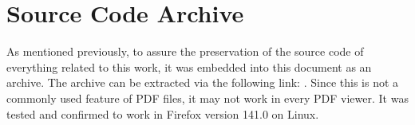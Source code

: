 \documentclass[a4paper]{article}
\begin{document}
















\appendix

\section{Source Code Archive}
As mentioned previously, to assure the preservation of the source code of everything related to this work, it was embedded into this document as an archive.
The archive can be extracted via the following link: .
Since this is not a commonly used feature of PDF files, it may not work in every PDF viewer.
It was tested and confirmed to work in Firefox version 141.0 on Linux.
\end{document}
